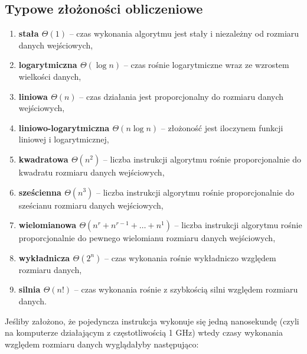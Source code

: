 \subsection{Typowe złożoności obliczeniowe}
\begin{enumerate}
	\item \textbf{stała $\Theta(1)$} -- czas wykonania algorytmu jest stały i niezależny od rozmiaru danych wejściowych,
	\item \textbf{logarytmiczna $\Theta(\log n)$} -- czas rośnie logarytmiczne wraz ze wzrostem wielkości danych,
	\item \textbf{liniowa $\Theta(n)$} -- czas działania jest proporcjonalny do rozmiaru danych wejściowych,
	\item \textbf{liniowo-logarytmiczna $\Theta(n \log n)$} -- złożoność jest iloczynem funkcji liniowej i logarytmicznej,
	\item \textbf{kwadratowa $\Theta(n^2)$} -- liczba instrukcji algorytmu rośnie proporcjonalnie do kwadratu rozmiaru danych wejściowych,
	\item \textbf{sześcienna $\Theta(n^3)$} -- liczba instrukcji algorytmu rośnie proporcjonalnie do sześcianu rozmiaru danych wejściowych,
	\item \textbf{wielomianowa $\Theta(n^r + n^{r-1} + \dots + n^1)$} -- liczba instrukcji algorytmu rośnie proporcjonalnie do pewnego wielomianu rozmiaru danych wejściowych,
	\item \textbf{wykładnicza $\Theta(2^n)$} -- czas wykonania rośnie wykładniczo względem rozmiaru danych,
	\item \textbf{silnia $\Theta(n!)$} -- czas wykonania rośnie z szybkością silni względem rozmiaru danych.
\end{enumerate}

Jeśliby założono, że pojedyncza instrukcja wykonuje się jedną nanosekundę (czyli na komputerze działającym z częstotliwością 1 GHz) wtedy czasy wykonania względem rozmiaru danych wyglądałyby następująco:


